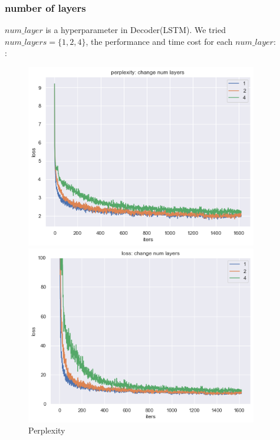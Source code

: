 \subsubsection{number of layers}
$num\_layer$ is a hyperparameter in Decoder(LSTM). We tried $num\_layers = \{1,2,4\}$, the performance and time cost for each $num\_layer$:\\:
\begin{figure}[H]
    \centering 
    \begin{minipage}[b]{0.3\textwidth} 
    \centering 
    \includegraphics[width=0.9\textwidth]{p_layer.png}
    \caption{Perplexity} 
    \label{Fig.1}
    \end{minipage}
    \begin{minipage}[b]{0.3\textwidth}
    \centering 
    \includegraphics[width=0.9\textwidth]{l_layer.png}

\end{minipage}
\end{figure}
